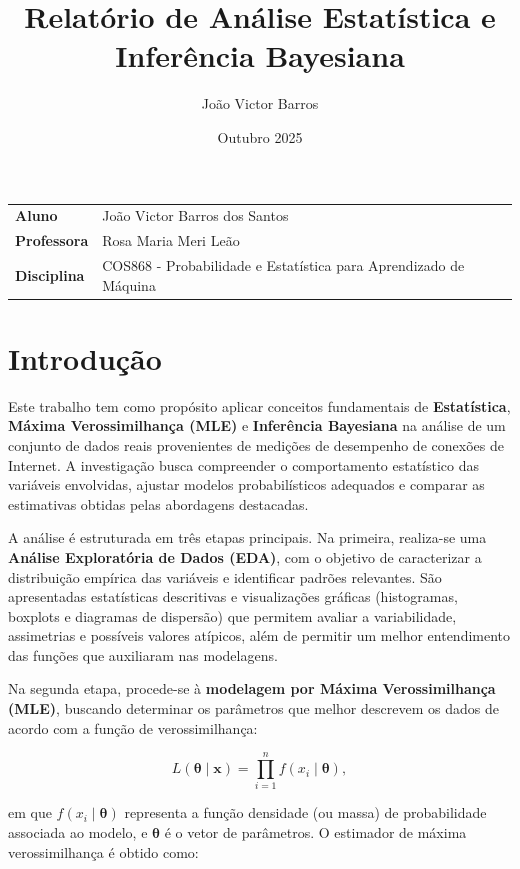 \documentclass{article}
\title{\vspace{-25pt}Relatório de Análise Estatística e Inferência Bayesiana}
\author{João Victor Barros}
\date{Outubro 2025}
\begin{document}
\maketitle

\noindent\begin{tabular}{@{}ll}
    \textbf{Aluno} & João Victor Barros dos Santos\\
    \textbf{Professora} & Rosa Maria Meri Leão\\
    \textbf{Disciplina} & COS868 - Probabilidade e Estatística para Aprendizado de Máquina
\end{tabular}

\section{Introdução}

Este trabalho tem como propósito aplicar conceitos fundamentais de \textbf{Estatística},
\textbf{Máxima Verossimilhança (MLE)} e \textbf{Inferência Bayesiana} na análise de um conjunto
de dados reais provenientes de medições de desempenho de conexões de Internet. A investigação
busca compreender o comportamento estatístico das variáveis envolvidas, ajustar modelos
probabilísticos adequados e comparar as estimativas obtidas pelas abordagens destacadas.

A análise é estruturada em três etapas principais. Na primeira, realiza-se uma
\textbf{Análise Exploratória de Dados (EDA)}, com o objetivo de caracterizar a distribuição
empírica das variáveis e identificar padrões relevantes. São apresentadas estatísticas
descritivas e visualizações gráficas (histogramas, boxplots e diagramas de dispersão) que
permitem avaliar a variabilidade, assimetrias e possíveis valores atípicos, além de permitir um melhor entendimento das funções que auxiliaram nas modelagens.

Na segunda etapa, procede-se à \textbf{modelagem por Máxima Verossimilhança (MLE)}, buscando
determinar os parâmetros que melhor descrevem os dados de acordo com a função de
verossimilhança:

\begin{equation}
	L(\boldsymbol{\theta} \mid \mathbf{x}) = \prod_{i=1}^{n} f(x_i \mid \boldsymbol{\theta}),
	\label{eq:likelihood}
\end{equation}

em que $f(x_i \mid \boldsymbol{\theta})$ representa a função densidade (ou massa) de probabilidade
associada ao modelo, e $\boldsymbol{\theta}$ é o vetor de parâmetros. O estimador de máxima
verossimilhança é obtido como:
\end{document}
